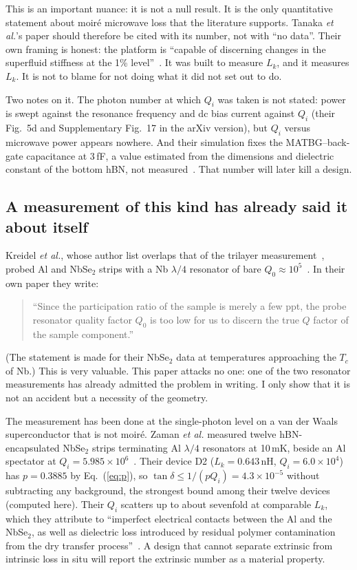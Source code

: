 \documentclass[aps,prb,reprint,superscriptaddress,longbibliography]{revtex4-2}
\begin{document}
This is an important nuance: it is not a null result. It is the only quantitative statement
about moir\'e microwave loss that the literature supports. Tanaka
\emph{et al.}'s paper should therefore be cited with its number, not
with ``no data''. Their own framing is honest: the platform is
``capable of discerning changes in the superfluid stiffness at the 1\%
level''~\cite{Tanaka2025}. It was built to measure $L_k$, and it
measures $L_k$. It is not to blame for not doing what it did not set out
to do.

Two notes on it. The photon number at which $Q_i$ was taken is not
stated: power is swept against the resonance frequency and dc bias
current against $Q_i$ (their Fig.~5d and Supplementary Fig.~17 in the
arXiv version), but
$Q_i$ versus microwave power appears nowhere. And their simulation fixes
the MATBG--back-gate capacitance at 3\,fF, a value estimated from the
dimensions and dielectric constant of the bottom hBN, not
measured~\cite{Tanaka2025}. That number will later kill a design.

\subsection{A measurement of this kind has already said it about itself}

Kreidel \emph{et al.}, whose author list overlaps that of the trilayer
measurement~\cite{Banerjee2025}, probed Al and NbSe$_2$ strips with a Nb
$\lambda/4$ resonator of bare $Q_0 \approx 10^{5}$~\cite{Kreidel2024}.
In their own paper they write:
\begin{quote}
``Since the participation ratio of the sample is merely a few ppt, the
probe resonator quality factor $Q_0$ is too low for us to discern the
true $Q$ factor of the sample component.''~\cite{Kreidel2024}
\end{quote}
(The statement is made for their NbSe$_2$ data at temperatures
approaching the $T_c$ of Nb.) This is very valuable. This paper attacks
no one: one of the two resonator measurements has already admitted the
problem in writing. I only show that it is not an accident but a
necessity of the geometry.

The measurement has been done at the single-photon level on a
van der Waals superconductor that is not moir\'e. Zaman \emph{et al.}
measured twelve hBN-encapsulated NbSe$_2$ strips terminating Al
$\lambda/4$ resonators at 10\,mK, beside an Al spectator at $Q_i = 5.985
\times 10^{6}$~\cite{Zaman2026}. Their device D2 ($L_k = 0.643$\,nH,
$Q_i = 6.0 \times 10^{4}$) has $p = 0.3885$ by Eq.~(\ref{eq:p}), so
$\tan\delta \leq 1/(pQ_i) = 4.3 \times 10^{-5}$ without subtracting any
background, the strongest bound among their twelve devices (computed
here). Their $Q_i$ scatters up to about sevenfold at comparable $L_k$, which
they attribute to ``imperfect electrical contacts between the Al and the
NbSe$_2$, as well as dielectric loss introduced by residual polymer
contamination from the dry transfer process''~\cite{Zaman2026}. A
design that cannot separate extrinsic from intrinsic loss in situ will
report the extrinsic number as a material property.
\end{document}
